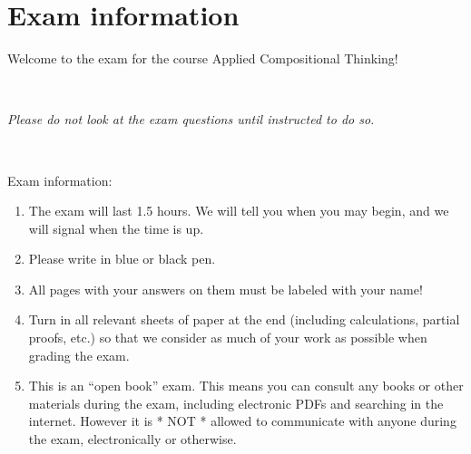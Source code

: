 \documentclass[paper=8.125in:10.250in,pagesize=pdftex,
    headinclude=false,footinclude=false,oneside,egregdoesnotlikesansseriftitles]{kaobook}
\begin{document}
\newpage

\section*{Exam information}


Welcome to the exam for the course Applied Compositional Thinking! 

\

\emph{Please do not look at the exam questions until instructed to do so.}

\

Exam information: 
\begin{enumerate}
\item The exam will last 1.5 hours. We will tell you when you may begin, and we will signal when the time is up. 
\item Please write in blue or black pen. 
\item All pages with your answers on them must be labeled with your name!
\item Turn in all relevant sheets of paper at the end (including calculations, partial proofs, etc.) so that we consider as much of your work as possible when grading the exam. 
\item This is an ``open book'' exam. This means you can consult any books or other materials during the exam, including electronic PDFs and searching in the internet. However it is * NOT * allowed to communicate with anyone during the exam, electronically or otherwise. 
\end{enumerate}

\newpage
\end{document}
